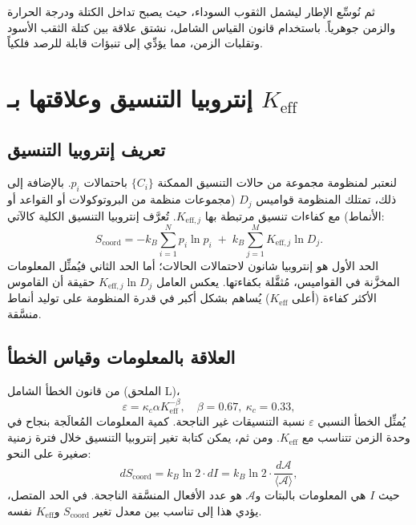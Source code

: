 \documentclass[11pt,a4paper]{article}
\newcommand{\kappac}{\kappa_c}
\newcommand{\Ke}{K_{\mathrm{eff}}}
\newcommand{\Keffi}[1]{K_{\mathrm{eff},#1}}
\newcommand{\Scoord}{S_{\mathrm{coord}}}
\begin{document}
	ثم نُوسِّع الإطار ليشمل الثقوب السوداء، حيث يصبح تداخل الكتلة ودرجة الحرارة والزمن جوهرياً. باستخدام قانون القياس الشامل، نشتق علاقة بين كتلة الثقب الأسود وتقلبات الزمن، مما يؤدِّي إلى تنبؤات قابلة للرصد فلكياً.
	
	\section{إنتروبيا التنسيق وعلاقتها بـ \(\Ke\)}
	\label{sec:coord_entropy}
	
	\subsection{تعريف إنتروبيا التنسيق}
	
	لنعتبر لمنظومة مجموعة من حالات التنسيق الممكنة \(\{C_i\}\) باحتمالات \(p_i\). بالإضافة إلى ذلك، تمتلك المنظومة قواميس \(D_j\) (مجموعات منظمة من البروتوكولات أو القواعد أو الأنماط) مع كفاءات تنسيق مرتبطة بها \(\Keffi{j}\). تُعرَّف إنتروبيا التنسيق الكلية كالآتي:
	\begin{equation}
		\Scoord = -k_B \sum_{i=1}^{N} p_i \ln p_i \;+\; k_B \sum_{j=1}^{M} \Keffi{j} \ln D_j.
		\label{eq:coord_entropy_def}
	\end{equation}
	الحد الأول هو إنتروبيا شانون لاحتمالات الحالات؛ أما الحد الثاني فيُمثِّل المعلومات المخزَّنة في القواميس، مُثقَّلة بكفاءتها. يعكس العامل \(\Keffi{j} \ln D_j\) حقيقة أن القاموس الأكثر كفاءة (أعلى \(\Ke\)) يُساهم بشكل أكبر في قدرة المنظومة على توليد أنماط منسَّقة.
	
	\subsection{العلاقة بالمعلومات وقياس الخطأ}
	
	من قانون الخطأ الشامل (الملحق L)،
	\begin{equation}
		\varepsilon = \kappac \alpha \Ke^{-\beta}, \quad \beta = 0.67,\ \kappac = 0.33,
	\end{equation}
	يُمثِّل الخطأ النسبي \(\varepsilon\) نسبة التنسيقات غير الناجحة. كمية المعلومات المُعالَجة بنجاح في وحدة الزمن تتناسب مع \(\Ke\). ومن ثم، يمكن كتابة تغير إنتروبيا التنسيق خلال فترة زمنية صغيرة على النحو:
	\begin{equation}
		d\Scoord = k_B \ln 2 \cdot dI = k_B \ln 2 \cdot \frac{d\mathcal{A}}{\langle \mathcal{A} \rangle},
	\end{equation}
	حيث \(I\) هي المعلومات بالبتات و\(\mathcal{A}\) هو عدد الأفعال المنسَّقة الناجحة. في الحد المتصل، يؤدي هذا إلى تناسب بين معدل تغير \(\Scoord\) و\(\Ke\) نفسه.
	
\end{document}
